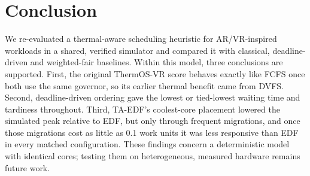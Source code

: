 \documentclass[conference]{IEEEtran}
\begin{document}
\section{Conclusion}\label{sec:conclusion}
We re-evaluated a thermal-aware scheduling heuristic for AR/VR-inspired workloads in a shared, verified simulator and compared it with classical, deadline-driven and weighted-fair baselines. Within this model, three conclusions are supported. First, the original ThermOS-VR score behaves exactly like FCFS once both use the same governor, so its earlier thermal benefit came from DVFS. Second, deadline-driven ordering gave the lowest or tied-lowest waiting time and tardiness throughout. Third, TA-EDF's coolest-core placement lowered the simulated peak relative to EDF, but only through frequent migrations, and once those migrations cost as little as 0.1 work units it was less responsive than EDF in every matched configuration. These findings concern a deterministic model with identical cores; testing them on heterogeneous, measured hardware remains future work.



\end{document}
